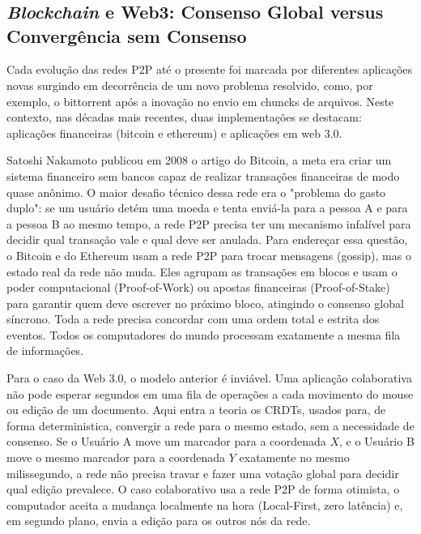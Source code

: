 \chapter{}

\section{\textit{Blockchain} e Web3: Consenso Global versus Convergência sem Consenso}

Cada evolução das redes P2P até o presente foi marcada por diferentes aplicações novas surgindo em decorrência de um novo problema resolvido, como, por exemplo,
o bittorrent após a inovação no envio em chuncks de arquivos. Neste contexto, nas décadas mais recentes, duas implementações se destacam:
aplicações financeiras (bitcoin e ethereum) e aplicações em web 3.0.

Satoshi Nakamoto publicou em 2008 o artigo do Bitcoin, a meta era criar um sistema financeiro sem bancos capaz de realizar transações financeiras de modo
quase anônimo. O maior desafio técnico dessa rede era o "problema do gasto duplo": se um usuário detém uma moeda e tenta enviá-la para a pessoa A e para a pessoa
B ao mesmo tempo, a rede P2P precisa ter um mecanismo infalível para decidir qual transação vale e qual deve ser anulada. Para endereçar essa questão,
o Bitcoin e do Ethereum usam a rede P2P para trocar mensagens (gossip), mas o estado real da rede não muda. Eles agrupam as transações em blocos e usam o
poder computacional (Proof-of-Work) ou apostas financeiras (Proof-of-Stake) para garantir quem deve escrever no próximo bloco, atingindo o consenso global
síncrono. Toda a rede precisa concordar com uma ordem total e estrita dos eventos. Todos os computadores do mundo processam exatamente a mesma fila de
informações.

Para o caso da Web 3.0, o modelo anterior é inviável. Uma aplicação colaborativa não pode esperar segundos em uma fila de operações a cada movimento do mouse ou
edição de um documento. Aqui entra a teoria os CRDTs, usados para, de forma deterministica, convergir a rede para o mesmo estado, sem a necessidade de consenso.
Se o Usuário A move um marcador para a coordenada $X$, e o Usuário B move o mesmo marcador para a coordenada $Y$ exatamente no mesmo milissegundo, a rede não
precisa travar e fazer uma votação global para decidir qual edição prevalece. O caso colaborativo usa a rede P2P de forma otimista, o computador aceita a mudança localmente
na hora (Local-First, zero latência) e, em segundo plano, envia a edição para os outros nós da rede.

